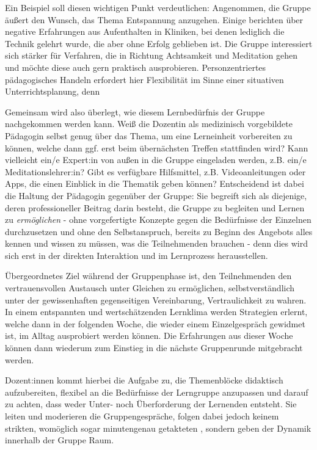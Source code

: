 \documentclass[
  twoside,
  parskip=half-,
  paper=176mm:246mm,
  BCOR=14mm,
  DIV=14,
]{scrreprt}
\begin{document}
\begin{praxis}Ein Beispiel soll diesen wichtigen Punkt verdeutlichen: Angenommen, die Gruppe äußert den Wunsch, das Thema Entspannung anzugehen. Einige berichten über negative Erfahrungen aus Aufenthalten in Kliniken, bei denen lediglich die Technik  gelehrt wurde, die aber ohne Erfolg geblieben ist. Die Gruppe interessiert sich stärker für Verfahren, die in Richtung Achtsamkeit und Meditation gehen und möchte diese auch gern praktisch ausprobieren. Personzentriertes pädagogisches Handeln erfordert hier Flexibilität im Sinne einer situativen Unterrichtsplanung, denn  
  
  Gemeinsam wird also überlegt, wie diesem Lernbedürfnis der Gruppe nachgekommen werden kann. Weiß die Dozentin als medizinisch vorgebildete Pädagogin selbst genug über das Thema, um eine Lerneinheit vorbereiten zu können, welche dann ggf. erst beim übernächsten Treffen stattfinden wird? Kann vielleicht ein/e Expert:in von außen in die Gruppe eingeladen werden, z.B. ein/e Meditationslehrer:in? Gibt es verfügbare Hilfsmittel, z.B. Videoanleitungen oder Apps, die einen Einblick in die Thematik geben können? Entscheidend ist dabei die Haltung der Pädagogin gegenüber der Gruppe: Sie begreift sich als diejenige, deren professioneller Beitrag darin besteht, die Gruppe zu begleiten und Lernen zu \textit{ermöglichen} - ohne vorgefertigte Konzepte gegen die Bedürfnisse der Einzelnen durchzusetzen und ohne den Selbstanspruch, bereits zu Beginn des Angebots alles kennen und wissen zu müssen, was die Teilnehmenden brauchen - denn dies wird sich erst in der direkten Interaktion und im Lernprozess herausstellen.
\end{praxis}

Übergeordnetes Ziel während der Gruppenphase ist, den Teilnehmenden den vertrauensvollen Austausch unter Gleichen zu ermöglichen, selbstverständlich unter der gewissenhaften gegenseitigen Vereinbarung, Vertraulichkeit zu wahren. In einem entspannten und wertschätzenden Lernklima werden Strategien erlernt, welche dann in der folgenden Woche, die wieder einem Einzelgespräch gewidmet ist, im Alltag ausprobiert werden können. Die Erfahrungen aus dieser Woche können dann wiederum zum Einstieg in die nächste Gruppenrunde mitgebracht werden.

Dozent:innen kommt hierbei die Aufgabe zu, die Themenblöcke didaktisch aufzubereiten, flexibel an die Bedürfnisse der Lerngruppe anzupassen und darauf zu achten, dass weder Unter- noch Überforderung der Lernenden entsteht. Sie leiten und moderieren die Gruppengespräche, folgen dabei jedoch keinem strikten, womöglich sogar minutengenau getakteten , sondern geben der Dynamik innerhalb der Gruppe Raum. 
\end{document}
